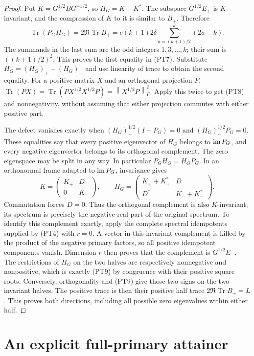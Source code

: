 \documentclass[11pt,a4paper]{article}
\providecommand{\Tr}{\operatorname{Tr}}
\providecommand{\norm}[1]{\left\lVert#1\right\rVert}
\begin{document}
\begin{proof}
Put \(K=G^{1/2}BG^{-1/2}\), so \(H_G=K+K^*\).
The subspace \(G^{1/2}E_+\) is \(K\)-invariant, and the
compression of \(K\) to it is similar to \(B_+\). Therefore
\[
 \Tr(P_GH_G)=2\Re\Tr B_+
 =e(k+1)2\delta\sum_{a=(k+1)/2}^k(2a-k).
\]
The summands in the last sum are the odd integers
\(1,3,\ldots,k\); their sum is \(((k+1)/2)^2\). This proves
the first equality in (PT7). Substitute
\(H_G=(H_G)_+-(H_G)_-\) and use linearity of trace to obtain
the second equality. For a positive matrix \(X\) and an orthogonal
projection \(P\),
\(\Tr(PX)=\Tr(PX^{1/2}X^{1/2}P)=\norm{X^{1/2}P}_F^2\).
Apply this twice to get (PT8) and nonnegativity, without assuming
that either projection commutes with either positive part.

The defect vanishes exactly when
\((H_G)_+^{1/2}(I-P_G)=0\) and \((H_G)_-^{1/2}P_G=0\).
These equalities say that every positive eigenvector of \(H_G\)
belongs to \(\operatorname{im} P_G\), and every negative eigenvector belongs
to its orthogonal complement. The zero eigenspace may be split in
any way. In particular \(P_GH_G=H_GP_G\).
In an orthonormal frame adapted to \(\operatorname{im} P_G\), invariance gives
\[
 K=\begin{pmatrix}K_+&D\\0&K_-\end{pmatrix},\qquad
 H_G=\begin{pmatrix}K_++K_+^*&D\\D^*&K_-+K_-^*\end{pmatrix}.
\]
Commutation forces \(D=0\). Thus the orthogonal complement is
also \(K\)-invariant; its spectrum is precisely the negative-real
part of the original spectrum. To identify this complement exactly,
apply the complete spectral idempotents supplied by (PT4) with
\(r=0\). A vector in this invariant complement is killed by the
product of the negative primary factors, so all positive idempotent
components vanish. Dimension \(r\) then proves that the complement
is \(G^{1/2}E_-\). The restrictions of \(H_G\) on the two halves
are respectively nonnegative and nonpositive, which is exactly
(PT9) by congruence with their positive square roots.
Conversely, orthogonality and (PT9) give those two signs on the
two invariant halves. The positive trace is then their positive
half trace \(2\Re\Tr B_+=L\). This proves both directions,
including all possible zero eigenvalues within either half.
\end{proof}

\section{An explicit full-primary attainer}
\end{document}
